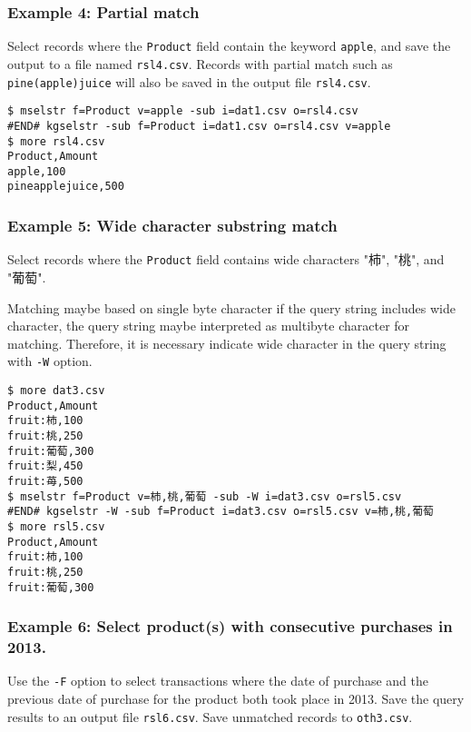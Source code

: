 \subsubsection*{Example 4: Partial match}

Select records where the \verb|Product| field contain the keyword \verb|apple|, and save the output to a file named  \verb|rsl4.csv|. Records with partial match such as \verb|pine(apple)juice| will also be saved in the output file \verb|rsl4.csv|.


\begin{Verbatim}[baselinestretch=0.7,frame=single]
$ mselstr f=Product v=apple -sub i=dat1.csv o=rsl4.csv
#END# kgselstr -sub f=Product i=dat1.csv o=rsl4.csv v=apple
$ more rsl4.csv
Product,Amount
apple,100
pineapplejuice,500
\end{Verbatim}
\subsubsection*{Example 5: Wide character substring match}

Select records where the \verb|Product| field contains wide characters  "柿", "桃", and "葡萄".

Matching maybe based on single byte character if the query string includes wide character, the query string maybe interpreted as multibyte character for matching. Therefore, it is necessary indicate wide character in the query string with \verb|-W| option.


\begin{Verbatim}[baselinestretch=0.7,frame=single]
$ more dat3.csv
Product,Amount
fruit:柿,100
fruit:桃,250
fruit:葡萄,300
fruit:梨,450
fruit:苺,500
$ mselstr f=Product v=柿,桃,葡萄 -sub -W i=dat3.csv o=rsl5.csv
#END# kgselstr -W -sub f=Product i=dat3.csv o=rsl5.csv v=柿,桃,葡萄
$ more rsl5.csv
Product,Amount
fruit:柿,100
fruit:桃,250
fruit:葡萄,300
\end{Verbatim}
\subsubsection*{Example 6: Select product(s) with consecutive purchases in 2013.}

Use the \verb|-F| option to select transactions where the date of purchase and the previous date of purchase for the product both took place in 2013.  Save the query results to an output file \verb|rsl6.csv|. Save unmatched records to \verb|oth3.csv|.



